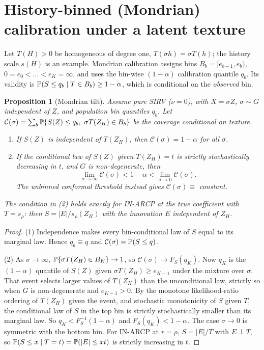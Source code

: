 \documentclass[11pt]{article}
\newtheorem{proposition}{Proposition}
\theoremstyle{remark}\newtheorem{remark}{Remark}
\begin{document}
\section{History-binned (Mondrian) calibration under a latent texture}
Let $T(H)>0$ be homogeneous of degree one, $T(\sigma h)=\sigma T(h)$; the history scale $s(H)$ is an example. Mondrian calibration assigns bins $B_b=[e_{b-1},e_b)$, $0=e_0<\dots<e_K=\infty$, and uses the bin-wise $(1-\alpha)$ calibration quantile $q_b$. Its validity is $\mathbb P(S\le q_b\mid T\in B_b)\ge1-\alpha$, which is conditional on the \emph{observed} bin.
\begin{proposition}[Mondrian tilt]\label{prop:mondrian}
Assume pure SIRV ($\nu=0$), with $X=\sigma Z$, $\sigma\sim G$ independent of $Z$, and population bin quantiles $q_b$. Let $\mathcal C(\sigma)=\sum_b\mathbb P\{S(Z)\le q_b,\ \sigma T(Z_H)\in B_b\}$ be the coverage conditional on texture.
\begin{enumerate}
\item If $S(Z)$ is independent of $T(Z_H)$, then $\mathcal C(\sigma)=1-\alpha$ for all $\sigma$.
\item If the conditional law of $S(Z)$ given $T(Z_H)=t$ is strictly stochastically decreasing in $t$, and $G$ is non-degenerate, then
\[
\lim_{\sigma\to\infty}\mathcal C(\sigma)<1-\alpha<\lim_{\sigma\to0}\mathcal C(\sigma).
\]
The unbinned conformal threshold instead gives $\mathcal C(\sigma)\equiv$ constant.
\end{enumerate}
The condition in (2) holds exactly for IN-ARCP at the true coefficient with $T=s_\rho$: then $S=|E|/s_\rho(Z_H)$ with the innovation $E$ independent of $Z_H$.
\end{proposition}
\begin{proof}
(1) Independence makes every bin-conditional law of $S$ equal to its marginal law. Hence $q_b\equiv q$ and $\mathcal C(\sigma)=\mathbb P(S\le q)$.

(2) As $\sigma\to\infty$, $\mathbb P\{\sigma T(Z_H)\in B_K\}\to1$, so $\mathcal C(\sigma)\to F_S(q_K)$. Now $q_K$ is the $(1-\alpha)$ quantile of $S(Z)$ given $\sigma T(Z_H)\ge e_{K-1}$ under the mixture over $\sigma$. That event selects larger values of $T(Z_H)$ than the unconditional law, strictly so when $G$ is non-degenerate and $e_{K-1}>0$. By the monotone likelihood-ratio ordering of $T(Z_H)$ given the event, and stochastic monotonicity of $S$ given $T$, the conditional law of $S$ in the top bin is strictly stochastically smaller than its marginal law. So $q_K<F_S^{-1}(1-\alpha)$ and $F_S(q_K)<1-\alpha$. The case $\sigma\to0$ is symmetric with the bottom bin. For IN-ARCP at $r=\rho$, $S=|E|/T$ with $E\perp T$, so $\mathbb P(S\le x\mid T=t)=\mathbb P(|E|\le xt)$ is strictly increasing in $t$.
\end{proof}
\end{document}
